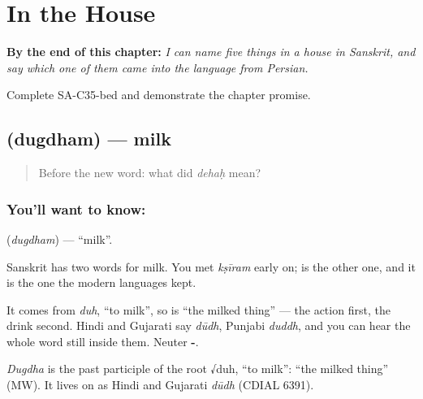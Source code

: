 
\chapter{In the House}
\label{ch:sa-house}

\begin{chapteropening}
\textbf{By the end of this chapter:} \emph{I can name five things in a house in Sanskrit, and say which one of them came into the language from Persian.}

Complete SA-C35-bed and demonstrate the chapter promise.
\end{chapteropening}

\section[\texorpdfstring{\sk{दुग्धम्} (dugdham)}{दुग्धम् (dugdham)}]{ (dugdham) — milk}

\label{lesson:SA-C35-milk}



\begin{quote}
Before the new word: what did \emph{dehaḥ} mean?
\end{quote}

\subsection*{You'll want to know: }
\textbf{} (\emph{dugdham}) — \textquotedblleft{}milk\textquotedblright{}.

Sanskrit has two words for milk. You met \emph{kṣīram} early on; \textbf{} is the other one, and it is the one the modern languages kept.

It comes from \emph{duh}, \textquotedblleft{}to milk\textquotedblright{}, so \textbf{} is \textquotedblleft{}the milked thing\textquotedblright{} — the action first, the drink second. Hindi and Gujarati say \emph{dūdh}, Punjabi \emph{duddh}, and you can hear the whole word still inside them. Neuter \textbf{-}.

\begin{cousinweb}
\emph{Dugdha} is the past participle of the root √duh, \textquotedblleft{}to milk\textquotedblright{}: \textquotedblleft{}the milked thing\textquotedblright{} (MW). It lives on as Hindi and Gujarati \emph{dūdh} (CDIAL 6391).
\end{cousinweb}

